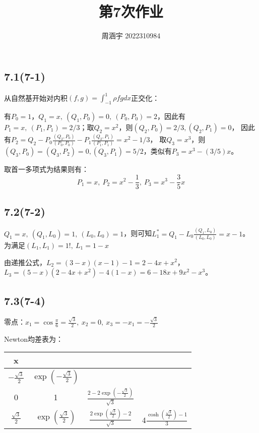 \documentclass[UTF8,zihao=5]{ctexart}
\title{{\bfseries 第7次作业}}
\author{周涵宇 2022310984}
\date{}
\begin{document}
\maketitle

\subsection*{7.1(7-1)}

从自然基开始对内积$(f,g)=\int_{-1}^{1}{\rho fg dx}$正交化：

有$P_0=1$，$Q_1=x,\ (Q_1,P_0)=0,\ (P_0,P_0)=2$，因此有
$P_1=x,\ (P_1,P_1)=2/3$；取$Q_2=x^2$，则$(Q_2,P_0)=2/3, (Q_2,P_1)=0$，
因此有$P_2=Q_2-P_0\frac{(Q_2,P_0)}{(P_0,P_0)}-P_1\frac{(Q_2,P_1)}{(P_1,P_1)}=x^2-1/3$，
取$Q_3=x^3$，则$(Q_3,P_0)=(Q_3,P_2)=0, (Q_3,P_1)=5/2$，类似有$P_3=x^3-(3/5)x$。

取首一多项式为结果则有：
$$
    P_1=x,\ P_2=x^2-\frac{1}{3},\ P_3=x^3-\frac{3}{5}x
$$

\subsection*{7.2(7-2)}

$Q_1=x,\ (Q_1,L_0)=1,\ (L_0,L_0)=1$，则可知$L_1^*=Q_1-L_0\frac{(Q_1,L_0)}{(L_0,L_0)}=x-1$。
为满足$(L_1,L_1)=1!,\ L_1=1-x$

由递推公式，$L_2=(3-x)(x-1)-1=2-4x+x^2$，$L_3=(5-x)(2-4x+x^2)-4(1-x)=6-18x+9x^2-x^3$。

\subsection*{7.3(7-4)}

零点：$x_1=\cos{\frac{\pi}{6}}=\frac{\sqrt{3}}{2},\ x_2=0,\ x_3=-x_1=-\frac{\sqrt{3}}{2}$

Newton均差表为：
\begin{table}[H]
    \centering
    \begin{tabular}{c|ccc}
        x                                                                                                                                                \\
        \hline
        $-\frac{\sqrt{3}}{2}$ & $\exp(-\frac{\sqrt{3}}{2})$                                                                                              \\
        0                     & 1                           & $\frac{2-2\exp(-\frac{\sqrt{3}}{2})}{\sqrt{3}}$                                            \\
        $\frac{\sqrt{3}}{2}$  & $\exp(\frac{\sqrt{3}}{2})$  & $\frac{2\exp(\frac{\sqrt{3}}{2})-2}{\sqrt{3}}$  & $4\frac{\cosh(\frac{\sqrt{3}}{2})-1}{3}$ \\
    \end{tabular}
\end{table}
\end{document}
